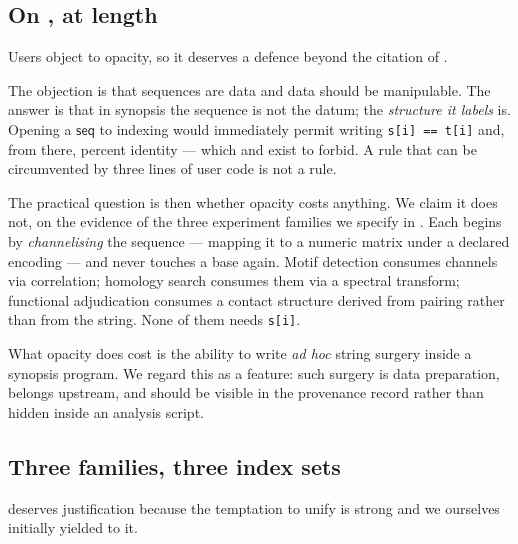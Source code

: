 \documentclass[11pt,twocolumn,a4paper]{article}
\theoremstyle{plain}
\theoremstyle{definition}
\theoremstyle{remark}
\newcommand{\typ}[1]{\ensuremath{\mathsf{#1}}}
\begin{document}
\subsection{On , at length}
\label{sec:opaque}

Users object to opacity, so it deserves a defence beyond the citation of
.

The objection is that sequences are data and data should be
manipulable. The answer is that in synopsis the sequence is not the
datum; the \emph{structure it labels} is. Opening a \typ{seq} to
indexing would immediately permit writing
\texttt{s[i] == t[i]} and, from there, percent identity --- which
 and  exist to forbid. A rule that
can be circumvented by three lines of user code is not a rule.

The practical question is then whether opacity costs anything. We claim
it does not, on the evidence of the three experiment families we
specify in . Each begins by \emph{channelising} the
sequence --- mapping it to a numeric matrix under a declared encoding
--- and never touches a base again. Motif detection consumes channels
via correlation; homology search consumes them via a spectral transform;
functional adjudication consumes a contact structure derived from
pairing rather than from the string. None of them needs
\texttt{s[i]}.

What opacity does cost is the ability to write \emph{ad hoc} string
surgery inside a synopsis program. We regard this as a feature: such
surgery is data preparation, belongs upstream, and should be visible in
the provenance record rather than hidden inside an analysis script.

\subsection{Three families, three index sets}
\label{sec:threefamilies}

 deserves justification because the temptation to unify
is strong and we ourselves initially yielded to it.
\end{document}
